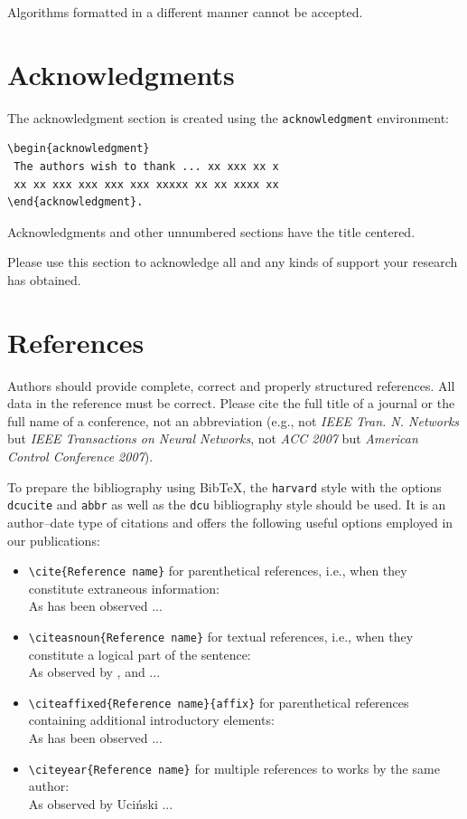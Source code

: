 \documentclass{amcs}
\begin{document}
Algorithms formatted in a different manner cannot be accepted.

\section{Acknowledgments}
The acknowledgment section is created using the \verb+acknowledgment+ environment:
{\small \begin{verbatim}
\begin{acknowledgment}
 The authors wish to thank ... xx xxx xx x
 xx xx xxx xxx xxx xxx xxxxx xx xx xxxx xx
\end{acknowledgment}.
\end{verbatim}}
Acknowledgments and other unnumbered sections have the title
centered.

Please use this section to acknowledge all and any kinds of support your research has obtained.

\section{References}
Authors should provide complete, correct and properly structured references. All data in the reference must be correct. Please cite the full title of a journal or the full name of a conference, not an abbreviation (e.g., not \emph{IEEE Tran. N. Networks} but \emph{IEEE Transactions on Neural Networks}, not \emph{ACC 2007} but \emph{American Control Conference 2007}).

To prepare the bibliography using Bib\TeX, the \verb+harvard+ style with the options \verb+dcucite+ and \verb+abbr+ as well as the \verb+dcu+ bibliography style should be used. It is an author--date type of citations and offers the following useful options employed in our publications:
\begin{itemize}
  \item \verb+\cite{Reference name}+ for parenthetical references, i.e., when they constitute extraneous information:\\[+1ex]
        As has been observed \cite{Haykin:99,Reinelt:02,Maryak:2001} ...
  \item \verb+\citeasnoun{Reference name}+ for textual references, i.e., when they constitute a logical part of the sentence:\\[+1ex]
        As observed by ,  and  ...
  \item \verb+\citeaffixed{Reference name}{affix}+ for parenthetical references containing additional introductory elements:\\[+1ex]
        As has been observed  ...
  \item \verb+\citeyear{Reference name}+ for multiple references to works by the same author:\\[+1ex]
        As observed by Uci\'nski \citeyear{Ucinski:99,Ucinski:05a,Ucinski:05b} ...
\end{itemize}
\end{document}
